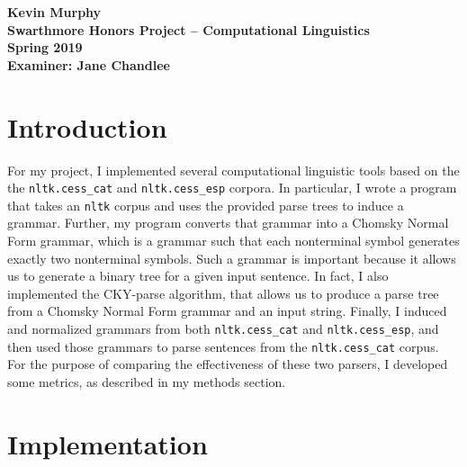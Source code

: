 \documentclass[paper=a4, fontsize=11pt]{scrartcl} %
\begin{document}
\textbf{%
Kevin Murphy\\
Swarthmore Honors Project -- Computational Linguistics\\
Spring 2019\\
Examiner: Jane Chandlee\\
}

\vspace{-20pt}

\section*{Introduction}

For my project, I implemented several computational linguistic tools based on the the \texttt{nltk.cess\_cat} and \texttt{nltk.cess\_esp} corpora.  In particular, I wrote a program that takes an \texttt{nltk} corpus and uses the provided parse trees to induce a grammar.  Further, my program converts that grammar into a Chomsky Normal Form grammar, which is a grammar such that each nonterminal symbol generates exactly two nonterminal symbols.  Such a grammar is important because it allows us to generate a binary tree for a given input sentence.  In fact, I also implemented the CKY-parse algorithm, that allows us to produce a parse tree from a Chomsky Normal Form grammar and an input string.  Finally, I induced and normalized grammars from both \texttt{nltk.cess\_cat} and \texttt{nltk.cess\_esp}, and then used those grammars to parse sentences from the \texttt{nltk.cess\_cat} corpus.  For the purpose of comparing the effectiveness of these two parsers, I developed some metrics, as described in my methods section.

\section*{Implementation}
\end{document}

